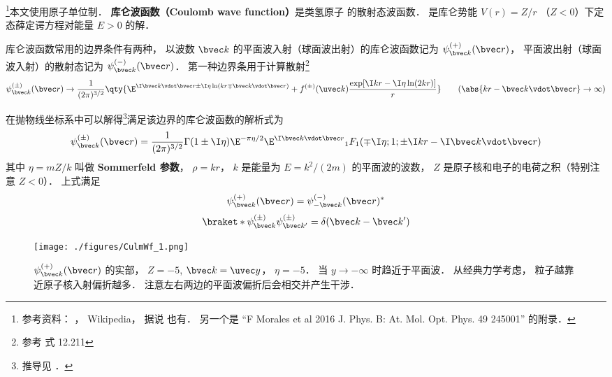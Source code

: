 

\footnote{参考资料： \cite{Brandsen}， Wikipedia， 据说 \cite{Merzbacher} 也有． 另一个是 “F Morales et al 2016 J. Phys. B: At. Mol. Opt. Phys. 49 245001” 的附录．}本文使用原子单位制． \textbf{库仑波函数（Coulomb wave function）}是类氢原子%
的散射态波函数． %
是库仑势能 $V(r) = Z/r$ （$Z < 0$）下定态薛定谔方程对能量 $E > 0$ 的解．

库仑波函数常用的边界条件有两种， 以波数 $\bvec k$ 的平面波入射（球面波出射）的库仑波函数记为 $\psi_{\bvec k}^{(+)}(\bvec r)$， 平面波出射（球面波入射）的散射态记为 $\psi_{\bvec k}^{(-)}(\bvec r)$． 第一种边界条用于计算散射\footnote{参考\cite{Brandsen} 式 12.211}
\begin{equation}\label{CulmWf_eq4}
\psi_{\bvec k}^{(\pm)}(\bvec r) \to \frac{1}{(2\pi)^{3/2}} \qty{\E^{\I\bvec k\vdot\bvec r \pm \I\eta\ln (kr \mp \bvec k \vdot\bvec r)}
+ f^{(\pm)}(\uvec k) \frac{\exp[\I kr - \I\eta \ln(2kr)]}{r}}
\qquad
(\abs{kr - \bvec k \vdot\bvec r} \to \infty)
\end{equation}

在抛物线坐标系中可以解得\footnote{推导见 \cite{Brandsen}．}满足该边界的库仑波函数的解析式为
\begin{equation}\label{CulmWf_eq7}
\psi_{\bvec k}^{(\pm)}(\bvec r) = \frac{1}{(2\pi)^{3/2}} \Gamma(1\pm \I\eta)\E^{-\pi\eta/2} \E^{\I\bvec k\vdot\bvec r} {_1F_1}(\mp\I\eta; 1; \pm\I kr - \I \bvec k\vdot \bvec r)
\end{equation}
其中 $\eta = mZ/k$ 叫做 \textbf{Sommerfeld 参数}， $\rho = kr$， $k$ 是能量为 $E = k^2/(2m)$ 的平面波的波数， $Z$ 是原子核和电子的电荷之积（特别注意 $Z < 0$）． 上式满足
\begin{equation}
\psi_{\bvec k}^{(+)}(\bvec r) = \psi_{-\bvec k}^{(-)}(\bvec r)^*
\end{equation}
\begin{equation}
\braket*{\psi_{\bvec k}^{(\pm)}}{\psi_{\bvec k'}^{(\pm)}} = \delta(\bvec k - \bvec k')
\end{equation}

\begin{figure}[ht]
\centering
\texttt{[image: ./figures/CulmWf\_1.png]} %
\caption{$\psi_{\bvec k}^{(+)}(\bvec r)$ 的实部， $Z = -5$, $\bvec k = \uvec y$， $\eta = -5$． 当 $y \to -\infty$ 时趋近于平面波． 从经典力学考虑， 粒子越靠近原子核入射偏折越多． 注意左右两边的平面波偏折后会相交并产生干涉．} \label{CulmWf_fig2}
\end{figure}

